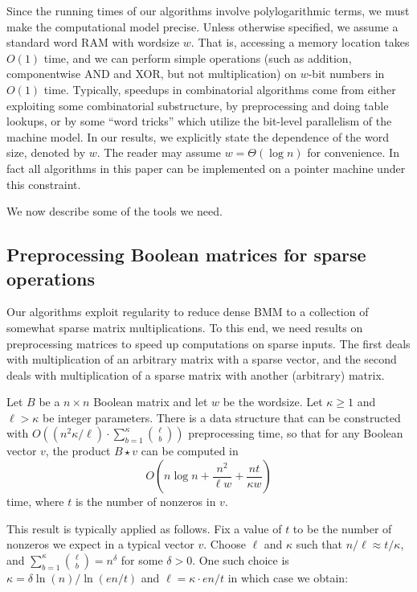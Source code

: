 Since the running times of our algorithms involve polylogarithmic terms, we must make the computational model precise. Unless otherwise specified, we assume a standard word RAM with wordsize $w$. That is, accessing a memory location takes $O(1)$ time, and we can perform simple operations (such as addition, componentwise AND and XOR, but not multiplication) on $w$-bit numbers in $O(1)$ time.
Typically, speedups in combinatorial algorithms come from either exploiting some combinatorial substructure, by preprocessing and doing table lookups, or by some ``word tricks'' which utilize the bit-level parallelism of the machine model.
In our results, we explicitly state the dependence of the word size, denoted by $w$. The reader may assume $w = \Theta(\log n)$ for convenience. In fact all algorithms in this paper can be implemented on a pointer machine under this constraint.

We now describe some of the tools we need.

\subsection{Preprocessing Boolean matrices for sparse operations}

Our algorithms exploit regularity to reduce dense BMM to a collection of somewhat sparse matrix multiplications. To this end, we need results on preprocessing matrices to speed up computations on sparse inputs. The first deals with multiplication of an arbitrary matrix with a sparse vector, and the second deals with multiplication of a sparse matrix with another (arbitrary) matrix.

\begin{theorem} \label{processforsparse}
Let $B$ be a $n \times n$ Boolean matrix and let $w$ be the wordsize. Let $\kappa \geq 1$ and $\ell > \kappa$ be integer parameters. There is a data structure that can be constructed with $O((n^2 \kappa / \ell) \cdot \sum_{b=1}^{\kappa} \binom{\ell}{b})$ preprocessing time, so that for any Boolean vector $v$, the product $B \star v$ can be computed  in 
\[
O\left(n \log n + \frac{n^2}{\ell w} + \frac{n t}{\kappa w}\right)
\]
time, where $t$ is the number of nonzeros in $v$.
\end{theorem}

This result is typically applied as follows. Fix a value of $t$ to be the number of nonzeros we expect in a typical vector $v$. Choose $\ell$ and $\kappa$ such that $n/\ell \approx t/\kappa$, and $\sum_{b=1}^{\kappa} \binom{\ell}{b} = n^\delta$ for some $\delta > 0$. One such choice is $\kappa = \delta \ln(n)/\ln(en/t)$ and $\ell = \kappa \cdot en/t$ in which case we obtain:

